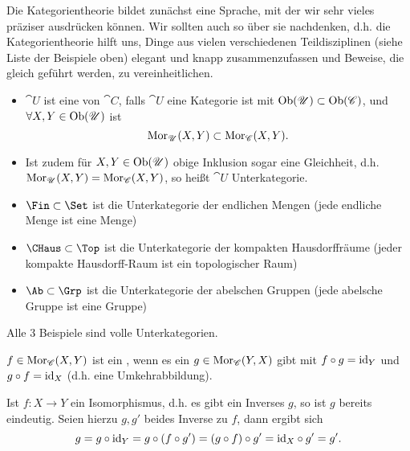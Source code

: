 \begin{dremark}
    Die Kategorientheorie bildet zunächst eine Sprache, mit der wir sehr vieles präziser ausdrücken können. Wir sollten auch so über sie nachdenken, d.h. die Kategorientheorie hilft uns, Dinge aus vielen verschiedenen Teildisziplinen (siehe Liste der Beispiele oben) elegant und knapp zusammenzufassen und Beweise, die gleich geführt werden, zu vereinheitlichen.
\end{dremark}
\begin{definition}[Unterkategorie]\label{def:unterkategorie}
    \begin{itemize}
        \item $\cat{U}$ ist eine  von $\cat{C}$, falls $\cat{U}$ eine Kategorie ist mit $\operatorname{Ob}(\mathscr{U}) \subset \operatorname{Ob}(\mathscr{C})$, und $\forall X,Y\in \operatorname{Ob}(\mathscr{U})$ ist
    \[
        \operatorname{Mor}_{\mathscr{U}}(X,Y) \subset \operatorname{Mor}_{\mathscr{C}}(X,Y)
    .\] 
\item Ist zudem für $X,Y \in \operatorname{Ob}(\mathscr{U})$ obige Inklusion sogar eine Gleichheit, d.h. $\operatorname{Mor}_{\mathscr{U}}(X,Y) = \operatorname{Mor}_{\mathscr{C}}(X,Y)$, so heißt $\cat{U}$  Unterkategorie. 
    \end{itemize}
\end{definition}

\begin{example}
    \begin{itemize}
        \item $\Fin \subset \Set$ ist die Unterkategorie der endlichen Mengen (jede endliche Menge ist eine Menge)
        \item $\CHaus \subset \Top$ ist die Unterkategorie der kompakten Hausdorffräume (jeder kompakte Hausdorff-Raum ist ein topologischer Raum)
        \item $\Ab\subset \Grp$ ist die Unterkategorie der abelschen Gruppen (jede abelsche Gruppe ist eine Gruppe)
    \end{itemize}
    Alle 3 Beispiele sind volle Unterkategorien.
\end{example}

\begin{definition}[Isomorphismus]\label{def:isomorphismus}
    $f\in \operatorname{Mor}_{\mathscr{C}}(X,Y)$ ist ein , wenn es ein $g\in \operatorname{Mor}_{\mathscr{C}}(Y,X)$ gibt mit $f \circ  g = \mathrm{id}_Y$ und $g \circ f = \mathrm{id}_X$ (d.h. eine Umkehrabbildung).
\end{definition}

\begin{recap}
    Ist $f\colon X\to Y$ ein Isomorphismus, d.h. es gibt ein Inverses  $g$, so ist  $g$ bereits eindeutig. Seien hierzu  $g,g'$ beides Inverse zu  $f$, dann ergibt sich
    \[
        g = g \circ  \mathrm{id}_{Y} = g \circ  (f \circ  g') = (g \circ  f) \circ  g' = \mathrm{id}_{X} \circ  g' = g' 
    .\] 
\end{recap}

